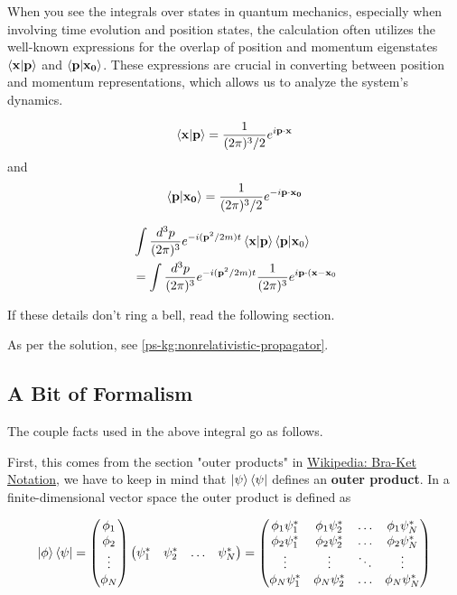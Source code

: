When you see the integrals over states in quantum mechanics, especially when involving time evolution and position states,
the calculation often utilizes the well-known expressions for the overlap of position and momentum eigenstates
$\braket{\boldsymbol{\mathbf{x}} | \boldsymbol{\mathbf{p}}}$ and $\braket{\boldsymbol{\mathbf{p}} | \boldsymbol{\mathbf{x_0}}}$.
These expressions are crucial in converting between position and momentum representations,
which allows us to analyze the system's dynamics.

$$
\braket{\boldsymbol{\mathbf{x}} | \boldsymbol{\mathbf{p}}} = \frac{1}{(2\pi)^3/2} e^{i\boldsymbol{\mathbf{p}}\cdot\boldsymbol{\mathbf{x}}}
$$
and 
$$
\braket{\boldsymbol{\mathbf{p}} | \boldsymbol{\mathbf{x_0}}} = \frac{1}{(2\pi)^3/2} e^{-i\boldsymbol{\mathbf{p}}\cdot\boldsymbol{\mathbf{x_0}}}
$$

\begin{align*}
& \int \frac{d^3p}{(2\pi)^3} e^{-i(\boldsymbol{\mathbf{p}}^2/2m)t} \braket{\boldsymbol{\mathbf{x}} | \boldsymbol{\mathbf{p}}} \braket{\boldsymbol{\mathbf{p}} | \boldsymbol{\mathbf{x}}_0} \\
&= \int \frac{d^3p}{(2\pi)^3} e^{-i(\boldsymbol{\mathbf{p}}^2/2m)t} \frac{1}{(2\pi)^3} e^{i\boldsymbol{\mathbf{p}}\cdot(\boldsymbol{\mathbf{x}}-\boldsymbol{\mathbf{x}}_0} 
\end{align*}

If these details don't ring a bell, read the following section.


As per the solution, see \ref{ps-kg:nonrelativistic-propagator}.


\subsection{A Bit of Formalism}

The couple facts used in the above integral go as follows.

First, this comes from the section "outer products" in
\href{https://en.wikipedia.org/wiki/Bra%E2%80%93ket_notation}{Wikipedia: Bra-Ket Notation},
we have to keep in mind that $\ket{\psi}\bra{\psi}$ defines an \textbf{outer product}.
In a finite-dimensional vector space the outer product is defined as

$$
\ket{\phi}\bra{\psi}
=
\begin{pmatrix}
    \phi_1 \\
    \phi_2 \\
    \vdots \\
    \phi_N 
\end{pmatrix}
\begin{pmatrix}
    \psi_{1}^{*} & \psi_{2}^{*} & \ldots & \psi_{N}^{*}
\end{pmatrix}
=
\begin{pmatrix} 
    \phi_1 \psi_{1}^{*} & \phi_1 \psi_{2}^{*} & \dots  & \phi_1 \psi_{N}^{*} \\
    \phi_2 \psi_{1}^{*} & \phi_2 \psi_{2}^{*} & \dots  & \phi_2 \psi_{N}^{*} \\
    \vdots              & \vdots              & \ddots & \vdots              \\
    \phi_N \psi_{1}^{*} & \phi_N \psi_{2}^{*} & \dots  & \phi_N \psi_{N}^{*} \\
\end{pmatrix}
$$

